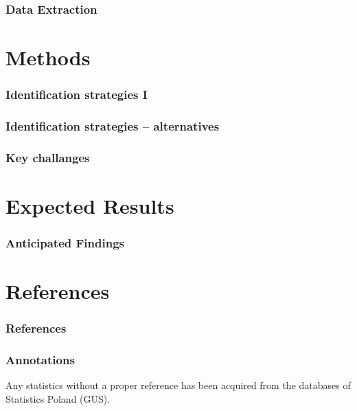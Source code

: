 \documentclass[aspectratio=169]{beamer}
\begin{document}
\begin{frame}
    \frametitle{Data Extraction}
    
\end{frame}


\section*{Methods}

\begin{frame}
    \frametitle{Identification strategies I}
    
\end{frame}

\begin{frame}
    \frametitle{Identification strategies -- alternatives}
   
    
\end{frame}


\begin{frame}
    \frametitle{Key challanges}
    
\end{frame}


\section*{Expected Results}
\begin{frame}
    \frametitle{Anticipated Findings}
    
\end{frame}


\section*{References}
\begin{frame}[allowframebreaks]
    \frametitle{References}
    
\end{frame}
\begin{frame}[allowframebreaks]
    \frametitle{Annotations}
    Any statistics without a proper reference has been acquired from the databases of Statistics Poland (GUS).
\end{frame}
\end{document}
